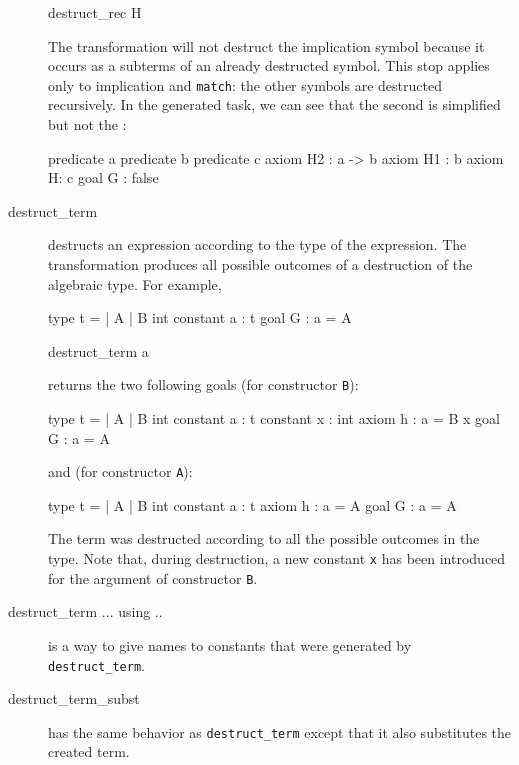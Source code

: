 \begin{description}
\begin{transwhy3}
destruct_rec H
\end{transwhy3}

The transformation will not destruct the implication symbol because it occurs
as a subterms of an already destructed symbol. This stop applies only to
implication and \texttt{match}: the other symbols are destructed recursively.
In the generated task, we can see that the second \whyf{/\\} is simplified but
not the \whyf{->}:
\begin{whycode}
predicate a
predicate b
predicate c
axiom H2 : a -> b
axiom H1 : b
axiom H: c
goal G : false
\end{whycode}


\item[destruct\_term] destructs an expression according to the type of the
  expression. The transformation produces all possible outcomes of a
  destruction of the algebraic type.
  For example,
\begin{whycode}
type t = | A | B int
constant a : t
goal G : a = A
\end{whycode}

\begin{transwhy3}
destruct_term a
\end{transwhy3}

returns the two following goals (for constructor \texttt{B}):

\begin{whycode}
type t = | A | B int
constant a : t
constant x : int
axiom h : a = B x
goal G : a = A
\end{whycode}

and (for constructor \texttt{A}):
\begin{whycode}
type t = | A | B int
constant a : t
axiom h : a = A
goal G : a = A
\end{whycode}

The term was destructed according to all the possible outcomes in the
type. Note that, during destruction, a new constant \texttt{x} has been
introduced for the argument of constructor \texttt{B}.


\item[destruct\_term ... using ..] is a way to give names to constants that were
  generated by \texttt{destruct\_term}.

\item[destruct\_term\_subst] has the same behavior as \texttt{destruct\_term}
  except that it also substitutes the created term.


\end{description}
